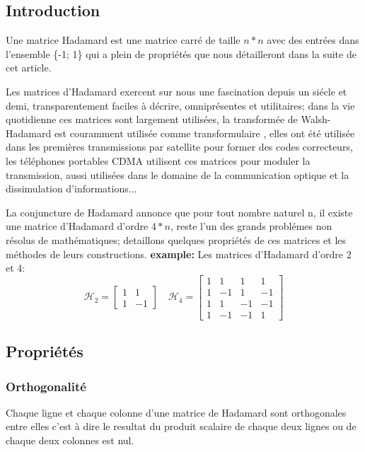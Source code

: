 \documentclass{article}
\begin{document}
\subsection{Introduction}
Une matrice Hadamard est une matrice carré de taille $n*n$ avec des entrées
dans l'ensemble \{-1; 1\} qui a plein de propriétés que nous détailleront 
dans la suite de cet article.

Les matrices d'Hadamard exercent sur nous une fascination depuis un siécle
et demi, transparentement faciles à décrire, omniprésentes et utilitaires;
dans la vie quotidienne ces matrices sont largement utilisées, la 
transformée de Walsh-Hadamard est couramment utilisée comme transformulaire
, elles ont été utilisée dans les premières transmissions par satellite 
pour former des codes correcteurs, les téléphones portables CDMA utilisent 
ces matrices pour moduler la transmission, aussi utilisées dans le domaine
de la communication optique et la dissimulation d'informations...

La conjuncture de Hadamard annonce que pour tout nombre naturel n, il 
existe une matrice d'Hadamard d'ordre $4*n$, reste l'un des grands 
problémes non résolus de mathématiques; detaillons quelques propriétés de 
ces matrices et les méthodes de leurs constructions.
\newpage
\textbf{example:} Les matrices d'Hadamard d'ordre 2 et 4:\\

\begin{equation*}
\mathcal{H}_2 = \begin{bmatrix}
	1 & 1\\
	1 & -1
\end{bmatrix}
\quad
\mathcal{H}_4 = \begin{bmatrix}
	1 & 1 & 1 & 1\\
	1 & -1 & 1 & -1\\
	1 & 1 & -1 & -1\\
	1 & -1 & -1 & 1
\end{bmatrix}
\end{equation*}

\subsection{Propriétés}

\subsubsection{Orthogonalité}

Chaque ligne et chaque colonne d'une matrice de Hadamard sont orthogonales
entre elles c'est à dire le resultat du produit scalaire de chaque deux 
lignes ou de chaque deux colonnes est nul.
\end{document}
